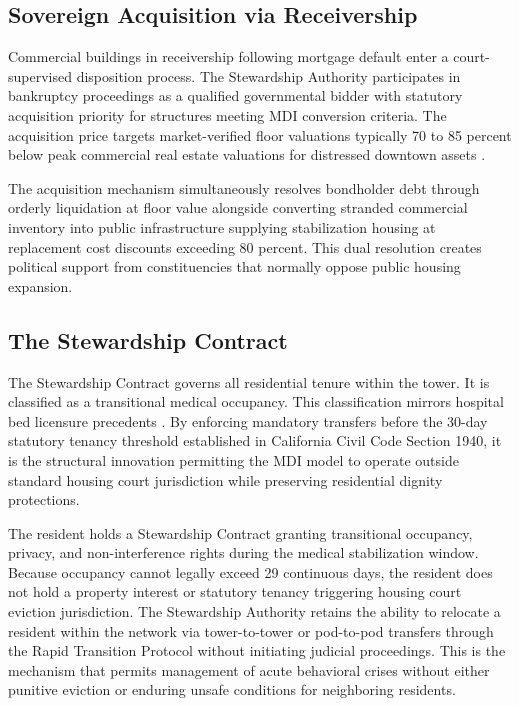 \documentclass[12pt, letterpaper]{article}
\begin{document}
\subsection{Sovereign Acquisition via Receivership}

Commercial buildings in receivership following mortgage default enter a court-supervised disposition process. The Stewardship Authority participates in bankruptcy proceedings as a qualified governmental bidder with statutory acquisition priority for structures meeting MDI conversion criteria. The acquisition price targets market-verified floor valuations typically 70 to 85 percent below peak commercial real estate valuations for distressed downtown assets \citep{globest_2025}.

The acquisition mechanism simultaneously resolves bondholder debt through orderly liquidation at floor value alongside converting stranded commercial inventory into public infrastructure supplying stabilization housing at replacement cost discounts exceeding 80 percent. This dual resolution creates political support from constituencies that normally oppose public housing expansion.

\subsection{The Stewardship Contract}

The Stewardship Contract governs all residential tenure within the tower. It is classified as a transitional medical occupancy. This classification mirrors hospital bed licensure precedents \citep{sro_hotel_licensure_2024}. By enforcing mandatory transfers before the 30-day statutory tenancy threshold established in California Civil Code Section 1940, it is the structural innovation permitting the MDI model to operate outside standard housing court jurisdiction while preserving residential dignity protections.

The resident holds a Stewardship Contract granting transitional occupancy, privacy, and non-interference rights during the medical stabilization window. Because occupancy cannot legally exceed 29 continuous days, the resident does not hold a property interest or statutory tenancy triggering housing court eviction jurisdiction. The Stewardship Authority retains the ability to relocate a resident within the network via tower-to-tower or pod-to-pod transfers through the Rapid Transition Protocol without initiating judicial proceedings. This is the mechanism that permits management of acute behavioral crises without either punitive eviction or enduring unsafe conditions for neighboring residents.
\end{document}
